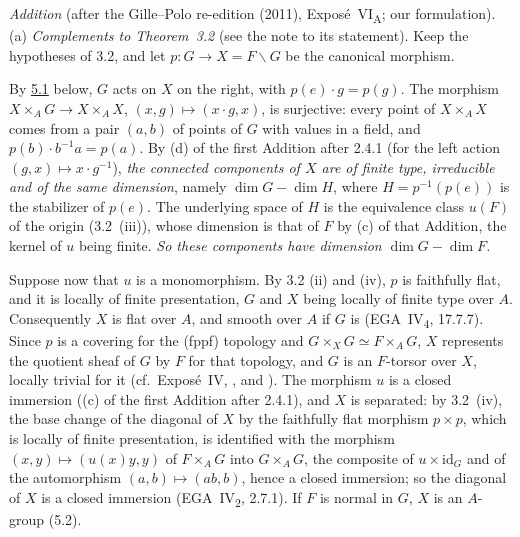 
\medskip\noindent
\emph{Addition} (after the Gille--Polo re-edition (2011), Exposé~VI\textsubscript{A}; our
formulation). (a) \emph{Complements to Theorem~3.2} (see the note to its statement). Keep the
hypotheses of 3.2, and let \(p\colon G\to X=F\backslash G\) be the canonical morphism.

By \hyperref[par:sga3-VIA-5.1]{5.1} below, \(G\) acts on \(X\) on the right, with \(p(e)\cdot g=p(g)\).
The morphism \(X\times_AG\to X\times_AX\), \((x,g)\mapsto(x\cdot g,x)\), is surjective: every point
of \(X\times_AX\) comes from a pair \((a,b)\) of points of \(G\) with values in a field, and
\(p(b)\cdot b^{-1}a=p(a)\). By (d) of the first Addition after 2.4.1 (for the left action
\((g,x)\mapsto x\cdot g^{-1}\)), \emph{the connected components of \(X\) are of finite type,
irreducible and of the same dimension}, namely \(\dim G-\dim H\), where \(H=p^{-1}(p(e))\) is the
stabilizer of \(p(e)\). The underlying space of \(H\) is the equivalence class \(u(F)\) of the origin
(3.2~(iii)), whose dimension is that of \(F\) by (c) of that Addition, the kernel of \(u\) being
finite. \emph{So these components have dimension \(\dim G-\dim F\).}

Suppose now that \(u\) is a monomorphism. By 3.2 (ii) and (iv), \(p\) is faithfully flat, and it is
locally of finite presentation, \(G\) and \(X\) being locally of finite type over \(A\).
Consequently \(X\) is flat over \(A\), and smooth over \(A\) if \(G\) is
(EGA~IV\textsubscript{4}, 17.7.7). Since \(p\) is a covering for the (fppf) topology and
\(G\times_XG\simeq F\times_AG\), \(X\) represents the quotient sheaf of \(G\) by \(F\) for that
topology, and \(G\) is an \(F\)-torsor over \(X\), locally trivial for it
(cf.\ Exposé~IV, ,
 and ). The
morphism \(u\) is a closed immersion ((c) of the first Addition after 2.4.1), and \(X\) is
separated: by 3.2~(iv), the base change of the diagonal of \(X\) by the faithfully flat morphism
\(p\times p\), which is locally of finite presentation, is identified with the morphism
\((x,y)\mapsto(u(x)y,y)\) of \(F\times_AG\) into \(G\times_AG\), the composite of \(u\times\mathrm{id}_G\)
and of the automorphism \((a,b)\mapsto(ab,b)\), hence a closed immersion; so the diagonal of \(X\)
is a closed immersion (EGA~IV\textsubscript{2}, 2.7.1). If \(F\) is normal in \(G\), \(X\) is an
\(A\)-group (5.2).

